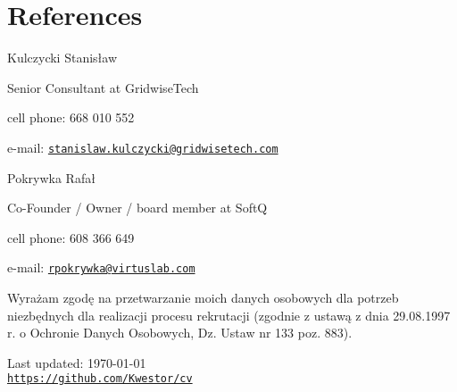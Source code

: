 \documentclass[a4paper,pdftex]{article}
\def\footerlink{https://github.com/Kwestor/cv}
\renewenvironment{itemize}{
  \begin{list}{}{
    \setlength{\leftmargin}{1.5em}
  }
}{
  \end{list}
}
\begin{document}
\section*{References}
\begin{itemize}
 \item Kulczycki Stanisław
  \begin{itemize}
   \setlength{\itemsep}{-0.3ex}
   \item Senior Consultant at GridwiseTech
   \item cell phone: 668 010 552
   \item e-mail: \href{mailto:stanislaw.kulczycki@gridwisetech.com}{\tt stanislaw.kulczycki@gridwisetech.com}
  \end{itemize}
 \item Pokrywka Rafał
  \begin{itemize}
   \setlength{\itemsep}{-0.3ex}
   \item Co-Founder / Owner / board member at SoftQ
   \item cell phone: 608 366 649
   \item e-mail: \href{mailto:rpokrywka@virtuslab.com}{\tt rpokrywka@virtuslab.com}
  \end{itemize}
\end{itemize}

\bigskip

Wyrażam zgodę na przetwarzanie  moich danych osobowych dla potrzeb niezbędnych dla realizacji procesu rekrutacji (zgodnie z ustawą z dnia 29.08.1997 r. o Ochronie Danych Osobowych, Dz. Ustaw nr 133 poz. 883). \\

\begin{comment}
I agree to the processing of my personal data in your company's recruitment, according to Poland's personal privacy regulations (Ust. z 29.08.97 r. o Ochronie Danych Osobowych Dz. U. nr 133 poz. 883). \\
\end{comment}
\begin{center}  
  \begin{footnotesize}
    Last updated: \today \\
    \href{\footerlink}{\texttt{\footerlink}}
  \end{footnotesize}
\end{center}
\end{document}
